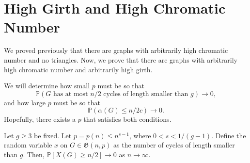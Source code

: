 \section{High Girth and High Chromatic Number}

We proved previously that there are graphs with arbitrarily high chromatic number and no triangles.
Now, we prove that there are graphs with arbitrarily high chromatic number and arbitrarily high girth.

We will determine how small \(p\) must be so that 
\begin{equation}
    \mathbb{P}(\text{\(G\) has at most \(n/2\) cycles of length smaller than \(g\)}) \to 0,
\end{equation}
and how large \(p\) must be so that
\begin{equation}
    \mathbb{P}(\alpha(G) \leq n/2c) \to 0.
\end{equation}
Hopefully, there exists a \(p\) that satisfies both conditions.

\begin{lemma} \label{lem:bounding-short-cycles}
    Let \(g \geq 3\) be fixed.
    Let \(p = p(n) \leq n^{s-1}\), where \(0 < s < 1/(g-1)\).
    Define the random variable \(x\) on \(G \in \mathfrak{G}(n, p)\) as the number of cycles of length smaller than \(g\).
    Then, \(\mathbb{P}[X(G) \geq n/2] \to 0\) as \(n \to \infty\).
\end{lemma}

